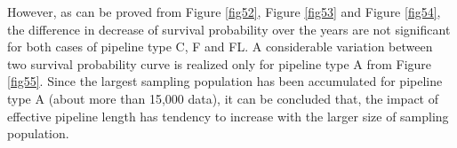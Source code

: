 However, as can be proved from Figure \ref{fig52}, Figure \ref{fig53} and Figure \ref{fig54}, the difference in decrease of survival probability over the years are not significant for both cases of pipeline type C, F and FL. A considerable variation between two survival probability curve is realized only for pipeline type A from Figure \ref{fig55}. Since the largest sampling population has been accumulated for pipeline type A (about more than 15,000 data), it can be concluded that, the impact of effective pipeline length has tendency to increase with the larger size of sampling population. 

